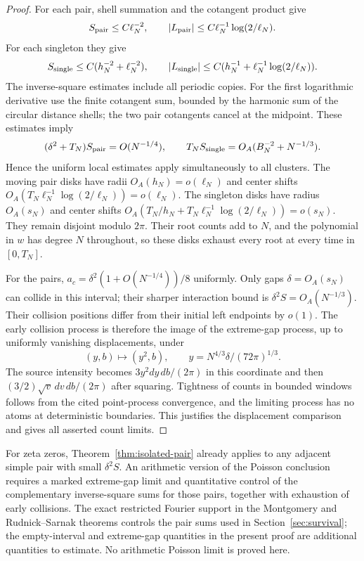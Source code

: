 \begin{proof}
For each pair, shell summation and the cotangent product give
\[
 S_{\rm pair}\le C\ell_N^{-2},\qquad
 |L_{\rm pair}|\le C\ell_N^{-1}\log(2/\ell_N).
\]
For each singleton they give
\[
 S_{\rm single}\le C(h_N^{-2}+\ell_N^{-2}),\qquad
 |L_{\rm single}|\le C(h_N^{-1}+\ell_N^{-1}\log(2/\ell_N)).
\]
The inverse-square estimates include all periodic copies. For the first logarithmic derivative use the finite cotangent sum, bounded by the harmonic sum of the circular distance shells; the two pair cotangents cancel at the midpoint. These estimates imply
\[
 (\delta^2+T_N)S_{\rm pair}=O(N^{-1/4}),\qquad
 T_NS_{\rm single}=O_A(B_N^{-2}+N^{-1/3}).
\]
Hence the uniform local estimates apply simultaneously to all clusters.
The moving pair disks have radii $O_A(h_N)=o(\ell_N)$ and center shifts $O_A(T_N\ell_N^{-1}\log(2/\ell_N))=o(\ell_N)$. The singleton disks have radius $O_A(s_N)$ and center shifts
$O_A(T_N/h_N+T_N\ell_N^{-1}\log(2/\ell_N))=o(s_N)$.
They remain disjoint modulo $2\pi$. Their root counts add to $N$, and the polynomial in $w$ has degree $N$ throughout, so these disks exhaust every root at every time in $[0,T_N]$.

For the pairs,
$a_c=\delta^2(1+O(N^{-1/4}))/8$ uniformly. Only gaps $\delta=O_A(s_N)$ can collide in this interval; their sharper interaction bound is $\delta^2S=O_A(N^{-1/3})$. Their collision positions differ from their initial left endpoints by $o(1)$. The early collision process is therefore the image of the extreme-gap process, up to uniformly vanishing displacements, under
\[
 (y,b)\longmapsto(y^2,b),\qquad
 y=N^{4/3}\delta/(72\pi)^{1/3}.
\]
The source intensity becomes $3y^2dy\,db/(2\pi)$ in this coordinate and then $(3/2)\sqrt v\,dv\,db/(2\pi)$ after squaring. Tightness of counts in bounded windows follows from the cited point-process convergence, and the limiting process has no atoms at deterministic boundaries. This justifies the displacement comparison and gives all asserted count limits.
\end{proof}

For zeta zeros, Theorem~\ref{thm:isolated-pair} already applies to any adjacent simple pair with small $\delta^2S$. An arithmetic version of the Poisson conclusion requires a marked extreme-gap limit and quantitative control of the complementary inverse-square sums for those pairs, together with exhaustion of early collisions. The exact restricted Fourier support in the Montgomery and Rudnick--Sarnak theorems controls the pair sums used in Section~\ref{sec:survival}; the empty-interval and extreme-gap quantities in the present proof are additional quantities to estimate. No arithmetic Poisson limit is proved here.
